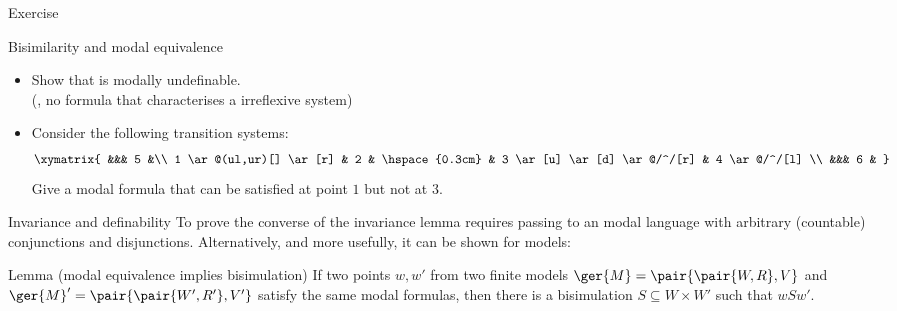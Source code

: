 \documentclass{beamer}
\begin{document}
\begin{slide}{\red Exercise}\label{s:32}
\small
\begin{exampleblock}{Bisimilarity and modal equivalence}
\begin{itemize}
\item Show that   is modally undefinable.
\\(\ie, no formula that characterises a irreflexive system)
\item Consider the following transition systems:
\begin{equation*}
\xymatrix{
&&& 5 &\\
1 \ar@(ul,ur)[]  \ar[r] & 2 & \hspace{0.3cm} & 3 \ar[u] \ar[d]  \ar@/^/[r]   & 4 \ar@/^/[l]  \\
&&& 6 &
}
\end{equation*}
Give a modal formula that can be satisfied at point $1$ but not at $3$.
\end{itemize}
\end{exampleblock}
\end{slide}

\begin{slide}{Invariance and definability}\label{s:33}
\small
To prove the converse of the invariance lemma requires passing to an  modal language  with arbitrary (countable) conjunctions and disjunctions. Alternatively, and more usefully, it can be shown  for  models:
\begin{block}{Lemma (modal equivalence implies bisimulation)}
If two points $w, w'$ from two finite models $\ger{M} = \pair{\pair{W, R}, V}$ and $\ger{M}' = \pair{\pair{W', R'}, V'}$ satisfy the same modal formulas, then there is a bisimulation
$S \subseteq W \times W'$  such that $w S w'$.
 \end{block}
\end{slide}
\end{document}
